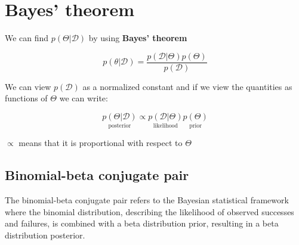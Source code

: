 \section{Bayes' theorem}
We can find $p (\Theta|\mathcal{D})$ by using \textbf{Bayes' theorem}

\begin{equation}
    p (\theta|\mathcal{D}) = \frac{p (\mathcal{D}|\Theta)p(\Theta)} {p(\mathcal{D})} 
\end{equation}

We can view $p(\mathcal{D})$ as a normalized constant and if we view the quantities as functions
of $\Theta$ we can write:

\begin{equation}
    \underset{\text{posterior}}{p (\Theta|\mathcal{D})}  \propto \underset{\text{likelihood}}{p (\mathcal{D}|\Theta)} \underset{\text{prior}}{p(\Theta)}
\end{equation}  

$\propto$ means that it is proportional with respect to $\Theta$

\subsection*{Binomial-beta conjugate pair}
The binomial-beta conjugate pair refers to the Bayesian statistical framework where the binomial distribution, describing the likelihood of observed successes and failures, is combined with a beta distribution prior, resulting in a beta distribution posterior.

